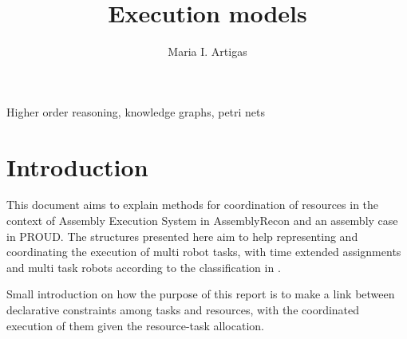 \documentclass[a4paper,10pt]{article}
\begin{document}
\title{Execution models}
\author{Maria I. Artigas}



\maketitle



\begin{abstract}

\end{abstract}


\begin{IEEEkeywords}
Higher order reasoning, knowledge graphs, petri nets
\end{IEEEkeywords}





\section{Introduction}

This document aims to explain methods for coordination of resources in the context of Assembly Execution System in AssemblyRecon and an assembly case in PROUD. The structures presented here aim to help representing and coordinating the execution of multi robot tasks,  with time extended assignments and multi task robots according to the classification in \cite{korsah2013comprehensive}. 

Small introduction on how the purpose of this report is to make a link between declarative constraints among tasks and resources, with the coordinated execution of them given the resource-task allocation.
\end{document}
